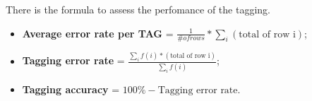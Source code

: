 There is the formula to assess the perfomance of the tagging.

\begin{itemize}
	\item \textbf{Average error rate per TAG} = $\frac{1}{\# of rows}*\sum_i (\text{total of row i})$;
	\item \textbf{Tagging error rate} = $\frac{\sum_i f(i)*(\text{total of row i})}{\sum_i f(i)}$;
	\item \textbf{Tagging accuracy} = $100\% - \text{Tagging error rate}$.
\end{itemize}